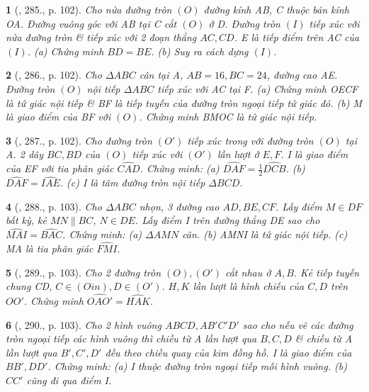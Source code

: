 \documentclass{article}
\newtheorem{baitoan}{}
\begin{document}
\begin{baitoan}[\cite{Binh_Toan_9_tap_2}, 285., p. 102]
	Cho nửa đường tròn $(O)$ đường kính AB, C thuộc bán kính OA. Đường vuông góc với AB tại C cắt $(O)$ ở D. Đường tròn $(I)$ tiếp xúc với nửa đường tròn \& tiếp xúc với 2 đoạn thẳng $AC,CD$. E là tiếp điểm trên AC của $(I)$. (a) Chứng minh $BD = BE$. (b) Suy ra cách dựng $(I)$.
\end{baitoan}

\begin{baitoan}[\cite{Binh_Toan_9_tap_2}, 286., p. 102]
	Cho $\Delta ABC$ cân tại A, $AB = 16,BC = 24$, đường cao AE. Đường tròn $(O)$ nội tiếp $\Delta ABC$ tiếp xúc với AC tại F. (a) Chứng minh OECF là tứ giác nội tiếp \& BF là tiếp tuyến của đường tròn ngoại tiếp tứ giác đó. (b) M là giao điểm của BF với $(O)$. Chứng minh BMOC là tứ giác nội tiếp.
\end{baitoan}

\begin{baitoan}[\cite{Binh_Toan_9_tap_2}, 287., p. 102]
	Cho đường tròn $(O')$ tiếp xúc trong với đường tròn $(O)$ tại A. 2 dây $BC,BD$ của $(O)$ tiếp xúc với $(O')$ lần lượt ở $E,F$. I là giao điểm của EF với tia phân giác $\widehat{CAD}$. Chứng minh: (a) $\widehat{DAF} = \frac{1}{2}\widehat{DCB}$. (b) $\widehat{DAF} = \widehat{IAE}$. (c) I là tâm đường tròn nội tiếp $\Delta BCD$.
\end{baitoan}

\begin{baitoan}[\cite{Binh_Toan_9_tap_2}, 288., p. 103]
	Cho $\Delta ABC$ nhọn, 3 đường cao $AD,BE,CF$. Lấy điểm $M\in DF$ bất kỳ, kẻ $MN\parallel BC$, $N\in DE$. Lấy điểm I trên đường thẳng DE sao cho $\widehat{MAI} = \widehat{BAC}$. Chứng minh: (a) $\Delta AMN$ cân. (b) AMNI là tứ giác nội tiếp. (c) MA là tia phân giác $\widehat{FMI}$.
\end{baitoan}

\begin{baitoan}[\cite{Binh_Toan_9_tap_2}, 289., p. 103]
	Cho 2 đường tròn $(O),(O')$ cắt nhau ở $A,B$. Kẻ tiếp tuyến chung CD, $C\in(Oin),D\in(O')$. $H,K$ lần lượt là hình chiếu của $C,D$ trên $OO'$. Chứng minh $\widehat{OAO'} = \widehat{HAK}$.
\end{baitoan}

\begin{baitoan}[\cite{Binh_Toan_9_tap_2}, 290., p. 103]
	Cho 2 hình vuông $ABCD,AB'C'D'$ sao cho nếu vẽ các đường tròn ngoại tiếp các hình vuông thì chiều từ A lần lượt qua $B,C,D$ \& chiều từ A lần lượt qua $B',C',D'$ đều theo chiều quay của kim đồng hồ. I là giao điểm của $BB',DD'$. Chứng minh: (a) I thuộc đường tròn ngoại tiếp mỗi hình vuông. (b) $CC'$ cũng đi qua điểm I.
\end{baitoan}
\end{document}

